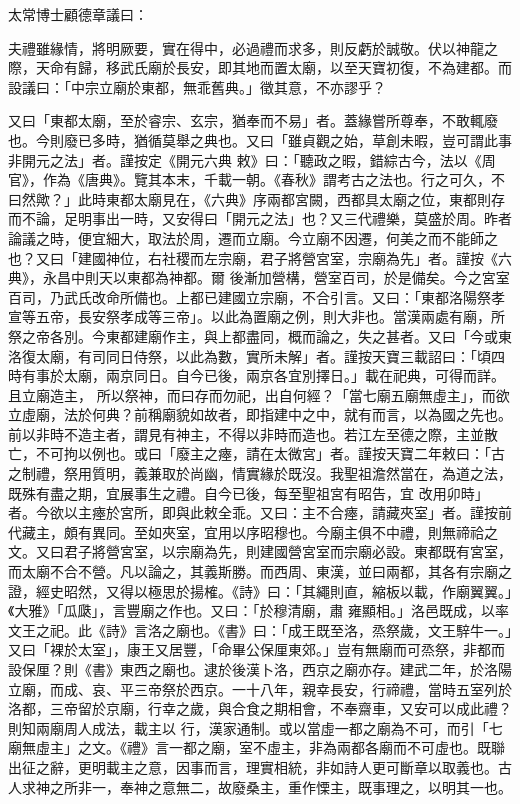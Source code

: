 \begin{pinyinscope}
 太常博士顧德章議曰：



 夫禮雖緣情，將明厥要，實在得中，必過禮而求多，則反虧於誠敬。伏以神龍之際，天命有歸，移武氏廟於長安，即其地而置太廟，以至天寶初復，不為建都。而設議曰：「中宗立廟於東都，無乖舊典。」徵其意，不亦謬乎？



 又曰「東都太廟，至於睿宗、玄宗，猶奉而不易」者。蓋緣嘗所尊奉，不敢輒廢也。今則廢已多時，猶循莫舉之典也。又曰「雖貞觀之始，草創未暇，豈可謂此事非開元之法」者。謹按定《開元六典
 敕》曰：「聽政之暇，錯綜古今，法以《周官》，作為《唐典》。覽其本末，千載一朝。《春秋》謂考古之法也。行之可久，不曰然歟？」此時東都太廟見在，《六典》序兩都宮闕，西都具太廟之位，東都則存而不論，足明事出一時，又安得曰「開元之法」也？又三代禮樂，莫盛於周。昨者論議之時，便宜細大，取法於周，遷而立廟。今立廟不因遷，何美之而不能師之也？又曰「建國神位，右社稷而左宗廟，君子將營宮室，宗廟為先」者。謹按《六典》，永昌中則天以東都為神都。爾
 後漸加營構，營室百司，於是備矣。今之宮室百司，乃武氏改命所備也。上都已建國立宗廟，不合引言。又曰：「東都洛陽祭孝宣等五帝，長安祭孝成等三帝」。以此為置廟之例，則大非也。當漢兩處有廟，所祭之帝各別。今東都建廟作主，與上都盡同，概而論之，失之甚者。又曰「今或東洛復太廟，有司同日侍祭，以此為數，實所未解」者。謹按天寶三載詔曰：「頃四時有事於太廟，兩京同日。自今已後，兩京各宜別擇日。」載在祀典，可得而詳。且立廟造主，
 所以祭神，而曰存而勿祀，出自何經？「當七廟五廟無虛主」，而欲立虛廟，法於何典？前稱廟貌如故者，即指建中之中，就有而言，以為國之先也。前以非時不造主者，謂見有神主，不得以非時而造也。若江左至德之際，主並散亡，不可拘以例也。或曰「廢主之瘞，請在太微宮」者。謹按天寶二年敕曰：「古之制禮，祭用質明，義兼取於尚幽，情實緣於既沒。我聖祖澹然當在，為道之法，既殊有盡之期，宜展事生之禮。自今已後，每至聖祖宮有昭告，宜
 改用卯時」者。今欲以主瘞於宮所，即與此敕全乖。又曰：主不合瘞，請藏夾室」者。謹按前代藏主，頗有異同。至如夾室，宜用以序昭穆也。今廟主俱不中禮，則無禘祫之文。又曰君子將營宮室，以宗廟為先，則建國營宮室而宗廟必設。東都既有宮室，而太廟不合不營。凡以論之，其義斯勝。而西周、東漢，並曰兩都，其各有宗廟之證，經史昭然，又得以極思於揚榷。《詩》曰：「其繩則直，縮板以載，作廟翼翼。」《大雅》「瓜瓞」，言豐廟之作也。又曰：「於穆清廟，肅
 雍顯相。」洛邑既成，以率文王之祀。此《詩》言洛之廟也。《書》曰：「成王既至洛，烝祭歲，文王騂牛一。」又曰「裸於太室」，康王又居豐，「命畢公保厘東郊。」豈有無廟而可烝祭，非都而設保厘？則《書》東西之廟也。逮於後漢卜洛，西京之廟亦存。建武二年，於洛陽立廟，而成、哀、平三帝祭於西京。一十八年，親幸長安，行禘禮，當時五室列於洛都，三帝留於京廟，行幸之歲，與合食之期相會，不奉齋車，又安可以成此禮？則知兩廟周人成法，載主以
 行，漢家通制。或以當虛一都之廟為不可，而引「七廟無虛主」之文。《禮》言一都之廟，室不虛主，非為兩都各廟而不可虛也。既聯出征之辭，更明載主之意，因事而言，理實相統，非如詩人更可斷章以取義也。古人求神之所非一，奉神之意無二，故廢桑主，重作慄主，既事理之，以明其一也。




\end{pinyinscope}
